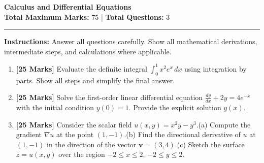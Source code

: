 \documentclass[11pt,a4paper]{article}
\begin{document}
\begin{center}
    {\LARGE \textbf{ Calculus and Differential Equations }} \\[0.5em]
    \textbf{Total Maximum Marks:} 75 \quad | \quad \textbf{Total Questions:} 3
\end{center}

\vspace{1em}
\hrule
\vspace{1.5em}

\noindent \textbf{Instructions:} Answer all questions carefully. Show all mathematical derivations, intermediate steps, and calculations where applicable.

\vspace{1.5em}

\begin{enumerate}[label=\textbf{Q\arabic*.}, leftmargin=2em]

    \item \textbf{[25 Marks]} Evaluate the definite integral \(\int_{0}^{1} x^{2} e^{x} \, dx\) using integration by parts. Show all steps and simplify the final answer.
    
    \vspace{1em}

    \item \textbf{[25 Marks]} Solve the first-order linear differential equation \(\frac{dy}{dx} + 2y = 4e^{-x}\) with the initial condition \(y(0)=1\). Provide the explicit solution \(y(x)\).
    
    \vspace{1em}

    \item \textbf{[25 Marks]} Consider the scalar field \(u(x,y) = x^{2} y - y^{3}\).\n(a) Compute the gradient \(\nabla u\) at the point \((1,-1)\).\n(b) Find the directional derivative of \(u\) at \((1,-1)\) in the direction of the vector \(\mathbf{v} = (3,4)\).\n(c) Sketch the surface \(z = u(x,y)\) over the region \(-2 \le x \le 2\), \(-2 \le y \le 2\).
    
    \vspace{1em}

\end{enumerate}
\end{document}
